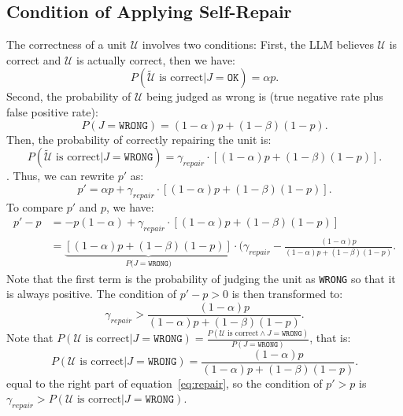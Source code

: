\subsection{Condition of Applying Self-Repair}\label{app:RaLU:repair}
The correctness of a unit $\mathcal{U}$ involves two conditions:
First, the LLM believes $\mathcal{U}$ is correct and $\mathcal{U}$ is actually correct, then we have:
\begin{equation}
    P(\tilde{\mathcal{U}} \text{ is correct} | J = \texttt{OK}) = \alpha p.
\end{equation}
Second, the probability of  $\mathcal{U}$ being judged as wrong is (true negative rate plus false positive rate):
\begin{equation}
    P(J=\texttt{WRONG}) = (1-\alpha)p + (1-\beta)(1-p).
\end{equation}
Then, the probability of correctly repairing the unit is:
\begin{equation}
    P(\tilde{\mathcal{U}} \text{ is correct} | J = \texttt{WRONG}) = \gamma_{repair} \cdot [(1-\alpha)p + (1-\beta)(1-p)].
\end{equation}.
Thus, we can rewrite $p'$ as:
\begin{equation}
    p' = \alpha p + \gamma_{repair} \cdot [(1-\alpha)p + (1-\beta)(1-p)].
\end{equation}
To compare $p'$ and $p$, we have:
\begin{equation}
\begin{split}
    p' - p &= -p(1-\alpha) + \gamma_{repair} \cdot [(1-\alpha)p + (1-\beta)(1-p)] \\
    &= \underbrace{[(1-\alpha)p + (1-\beta)(1-p)]}_{P(J=\texttt{WRONG)}} \cdot (\gamma_{repair} - \frac{(1-\alpha)p}{(1-\alpha)p + (1-\beta)(1-p)}.
\end{split}
\end{equation}
Note that the first term is the probability of judging the unit as \texttt{WRONG} so that it is always positive. The condition of $p'-p>0$ is then transformed to:
\begin{equation}\label{eq:repair}
    \gamma_{repair} > \frac{(1-\alpha)p}{(1-\alpha)p + (1-\beta)(1-p)}.
\end{equation}
Note that $P(\mathcal{U} \text{ is correct} | J=\texttt{WRONG}) = \frac{P(\mathcal{U}  \text{ is correct} \land J=\texttt{WRONG})}{P(J=\texttt{WRONG})}$, that is:
\begin{equation}
    P(\mathcal{U} \text{ is correct} | J=\texttt{WRONG}) = \frac{(1-\alpha)p}{(1-\alpha)p + (1-\beta)(1-p)}.
\end{equation}
equal to the right part of equation~\ref{eq:repair}, so the condition of $p'>p$ is $\gamma_{repair} > P(\mathcal{U} \text{ is correct} | J=\texttt{WRONG})$.

